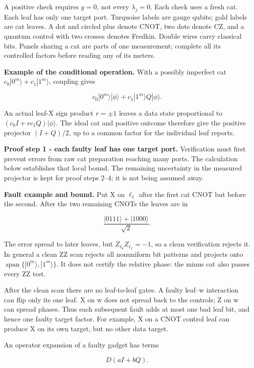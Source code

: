\documentclass[11pt]{article}
\begin{document}
A positive check requires \(y=0\), not every \(\lambda_j=0\). Each check uses a fresh cat. Each leaf has only one target port. Turquoise labels are gauge qubits; gold labels are cat leaves. A dot and circled plus denote CNOT, two dots denote CZ, and a quantum control with two crosses denotes Fredkin. Double wires carry classical bits. Panels sharing a cat are parts of one measurement; complete all its controlled factors before reading any of its meters.

\textbf{Example of the conditional operation.} With a possibly imperfect cat \(c_0|0^m\rangle+c_1|1^m\rangle\), coupling gives

\[
c_0|0^m\rangle|\phi\rangle+c_1|1^m\rangle Q|\phi\rangle.
\]

An actual leaf-X sign product \(r=\pm1\) leaves a data state proportional to \((c_0I+r c_1Q)|\phi\rangle\). The ideal cat and positive outcome therefore give the positive projector \((I+Q)/2\), up to a common factor for the individual leaf reports.

\textbf{Proof step 1 - each faulty leaf has one target port.} Verification must first prevent errors from raw cat preparation reaching many ports. The calculation below establishes that local bound. The remaining uncertainty in the measured projector is kept for proof steps 2--4; it is not being assumed away.

\textbf{Fault example and bound.} Put X on \(\ell_1\) after the first cat CNOT but before the second. After the two remaining CNOTs the leaves are in

\[
\frac{|0111\rangle+|1000\rangle}{\sqrt2}.
\]

The error spread to later leaves, but \(Z_{\ell_0}Z_{\ell_1}=-1\), so a clean verification rejects it. In general a clean ZZ scan rejects all nonuniform bit patterns and projects onto \(\operatorname{span}\{|0^m\rangle,|1^m\rangle\}\). It does not certify the relative phase: the minus cat also passes every ZZ test.

After the clean scan there are no leaf-to-leaf gates. A faulty leaf--w interaction can flip only its one leaf. X on w does not spread back to the controls; Z on w can spread phases. Thus each subsequent fault adds at most one bad leaf bit, and hence one faulty target factor. For example, X on a CNOT control leaf can produce X on its own target, but no other data target.

An operator expansion of a faulty gadget has terms

\[
D(aI+bQ).
\]
\end{document}
